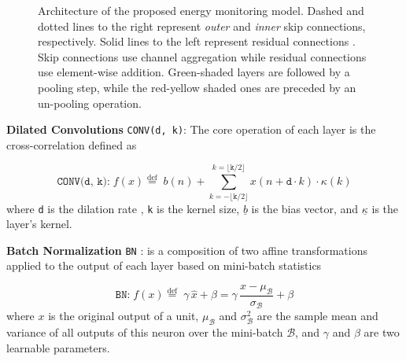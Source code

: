 \documentclass[twocolumn,letter,10pt]{IEEEtran} %
\begin{document}
\begin{figure}[!htbp]
	\caption{
		Architecture of the proposed energy monitoring model. Dashed and dotted lines to the right represent \emph{outer} and \emph{inner} skip connections, respectively. Solid lines to the left represent residual connections \cite{He_2015_ResNet}. Skip connections use channel aggregation while residual connections use element-wise addition. Green-shaded layers are followed by a pooling step, while the red-yellow shaded ones are preceded by an un-pooling operation.
	}
	\label{fig:ae-2-architecture}
\end{figure}

\textbf{Dilated Convolutions} \texttt{CONV(d, k)}: The core operation of each layer is the cross-correlation defined as

{\small\begin{equation*}
	\texttt{CONV(d, k):}\; f(x) \stackrel{\text{def}}{=}\;b(n) \plus \sum_{k=\minus\lfloor\texttt{k}/2\rfloor}^{k=\lfloor\texttt{k}/2\rfloor}x(n+\texttt{d}\cdot k)\cdot \kappa(k)
	\end{equation*}}%
where \texttt{d} is the dilation rate \cite{Yu_2016}, \texttt{k} is the kernel size, $\underline{b}$ is the bias vector, and $\underline{\kappa}$ is the layer's kernel.

\textbf{Batch Normalization} \texttt{BN} \cite{Ioffe_2015_BatchNormalization}: is a composition of two  affine transformations applied to the output of each layer based on mini-batch statistics

{\small\begin{equation*}
	\texttt{BN:}\;f(x) \stackrel{\text{def}}{=}\; \gamma\, \hat{x} + \beta = \gamma\, \frac{x - \mu_\mathcal{B}}{\sigma_\mathcal{B}} + \beta
	\end{equation*}}%
where $x$ is the original output of a unit, $\mu_\mathcal{B}$ and $\sigma^2_\mathcal{B}$ are the sample mean and variance of all outputs of this neuron over the mini-batch $\mathcal{B}$, and $\gamma$ and $\beta$ are two learnable parameters.
\end{document}
